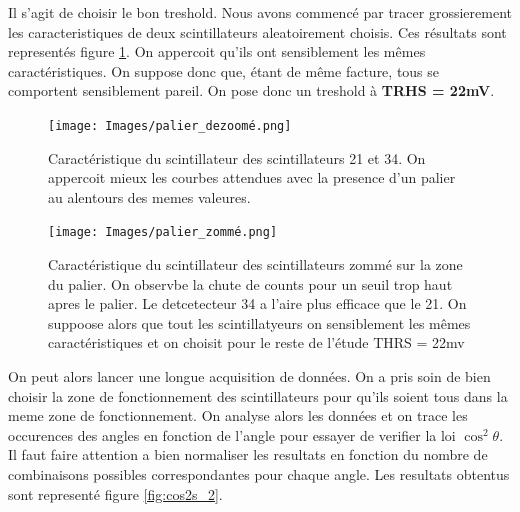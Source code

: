 \documentclass[a4paper,12pt,twoside]{article}
\begin{document}
Il s'agit de choisir le bon treshold. Nous avons commencé par tracer grossierement les caracteristiques de deux scintillateurs aleatoirement choisis. Ces résultats sont representés figure \ref{fig:caracteristique_scintillateur_2}.
 On appercoit qu'ils ont sensiblement les mêmes caractéristiques. On suppose donc que, étant de  même facture, tous se comportent sensiblement pareil. On pose donc un treshold à \textbf{TRHS = 22mV}.

\begin{figure}[!h]
  \begin{minipage}
  {0.45\textwidth}
    \centering
    \texttt{[image: Images/palier\_dezoomé.png]}
    \caption{Caractéristique du scintillateur des scintillateurs 21 et 34. On appercoit mieux les courbes attendues avec la presence d'un palier au alentours des memes valeures.}
    \label{fig:caracteristique_scintillateur_1}
  \end{minipage}
  \hfill
  \begin{minipage}{0.45\textwidth}
    \centering
    \texttt{[image: Images/palier\_zommé.png]}
    \caption{Caractéristique du scintillateur des scintillateurs zommé sur la zone du palier. On observbe la chute de counts pour un seuil trop haut apres le palier. Le detcetecteur 34 a l'aire plus efficace que le 21. On suppoose alors que tout les scintillatyeurs on sensiblement les mêmes caractéristiques et on choisit pour le reste de l'étude THRS = 22mv}
    \label{fig:caracteristique_scintillateur_2}
  \end{minipage}
\end{figure}

On peut alors lancer une longue acquisition de données. 
On a pris soin de bien choisir la zone de fonctionnement des scintillateurs pour qu'ils soient tous dans la meme zone de fonctionnement. 
On analyse alors les données et on trace les occurences des angles en fonction de l'angle pour essayer de verifier la loi $\cos^2\theta$.
Il faut faire attention a bien normaliser les resultats en fonction du nombre de combinaisons possibles correspondantes pour chaque angle.
Les resultats obtentus sont representé figure \ref{fig:cos2s_2}.
\end{document}
